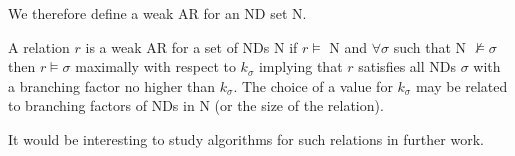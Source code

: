 \medskip

We therefore define a weak AR for an ND set N.

\begin{definition}
\begin{rm}
A relation $r$ is a weak AR for a set of NDs N if $r \models$ N and
$\forall \sigma$ such that N $\not\models \sigma$ then $r \models
\sigma$ maximally 
with respect to $k_\sigma$ implying that $r$ satisfies all NDs
$\sigma$ with a branching 
factor no higher than $k_\sigma$. The choice of a value for $k_\sigma$
may be related to branching factors of NDs in N (or the size of the relation).
\end{rm}
\end{definition}

It would be interesting to study algorithms for such relations in
further work. 





